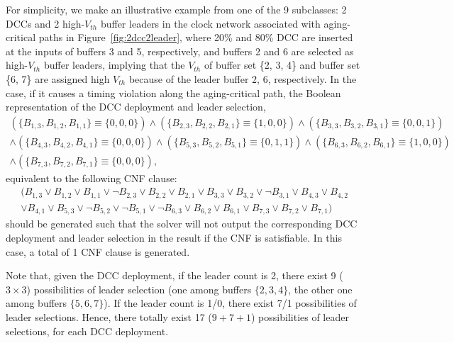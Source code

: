 For simplicity, we make an illustrative example from one of the 9 subclasses: 2 DCCs and 2 high-$V_{th}$ buffer leaders in the clock network associated with aging-critical paths in Figure~\ref{fig:2dcc2leader}, where 20\% and 80\% DCC are inserted at the inputs of buffers 3 and 5, respectively, and buffers 2 and 6 are selected as high-$V_{th}$ buffer leaders, implying that the $V_{th}$ of buffer set \{2, 3, 4\} and buffer set \{6, 7\} are assigned high $V_{th}$ because of the leader buffer 2, 6, respectively. In the case, if it causes a timing violation along the aging-critical path, the Boolean representation of the DCC deployment and leader selection,
{\fontsize{9}{10}
\begin{gather*}
\left(\{B_{1,3}, B_{1,2}, B_{1,1}\} \equiv \{0, 0, 0\} \right) \land \left( \{B_{2,3}, B_{2,2}, B_{2,1}\} \equiv \{1, 0, 0\} \right) \land \left(\{B_{3,3}, B_{3,2}, B_{3,1}\} \equiv \{0, 0, 1\} \right) \\ 
\land \left( \{B_{4,3}, B_{4,2}, B_{4,1}\} \equiv \{0, 0, 0\} \right) \land \left(\{B_{5,3}, B_{5,2}, B_{5,1}\} \equiv \{0, 1, 1\} \right) \land \left( \{B_{6,3}, B_{6,2}, B_{6,1}\} \equiv \{1, 0, 0\} \right)\\
\land \left( \{B_{7,3}, B_{7,2}, B_{7,1}\} \equiv \{0, 0, 0\} \right),
\end{gather*}}equivalent to the following CNF clause:
{\fontsize{9}{10}
\begin{gather*}
(B_{1,3} \lor B_{1,2} \lor B_{1,1} \lor \neg B_{2,3} \lor B_{2,2} \lor B_{2,1}  \lor B_{3,3} \lor B_{3,2} \lor \neg B_{3,1} \lor B_{4,3} \lor B_{4,2} \\
\lor B_{4,1} \lor B_{5,3} \lor \neg B_{5,2} \lor \neg B_{5,1} \lor \neg  B_{6,3} \lor B_{6,2} \lor B_{6,1} \lor B_{7,3} \lor B_{7,2} \lor B_{7,1} )
\end{gather*}}should be generated such that the solver will not output the corresponding DCC deployment and leader selection in the result if the CNF is satisfiable. In this case, a total of 1 CNF clause is generated.

Note that, given the DCC deployment, if the leader count is 2, there exist 9 ($3 \times 3$) possibilities of leader selection (one among buffers $\{2, 3, 4\}$, the other one among buffers $\{5, 6, 7\}$).
If the leader count is 1/0, there exist 7/1 possibilities of leader selections. Hence, there totally exist 17 ($9+7+1$) possibilities of leader selections, for each DCC deployment.




